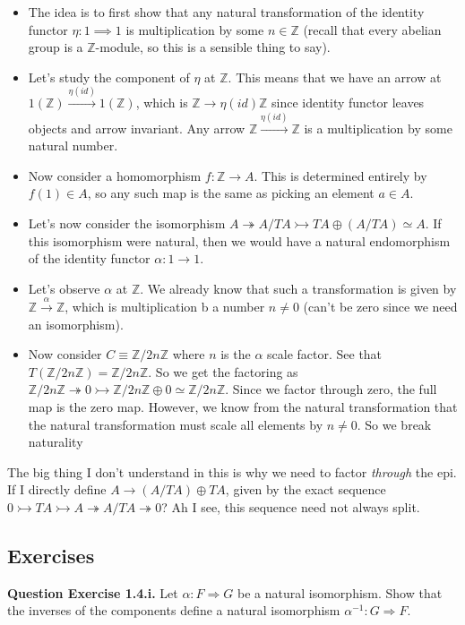 \documentclass[11pt]{report}
\newcommand{\Z}{\ensuremath{\mathbb{Z}}}
\newcommand{\inv}[1]{#1^{-1}}
\newcommand{\mono}{\rightarrowtail}
\newcommand{\epi}{\twoheadrightarrow}
\newcommand{\nt}{\Rightarrow}
\newcommand*{\question}[1]{\leavevmode\newline \textbf{Question #1.}}
\begin{document}
\begin{itemize}
\item The idea is to first show that any natural transformation of the identity functor $\eta: 1 \implies 1$ is multiplication by some $n \in \Z$
(recall that every abelian group is a \Z-module, so this is a sensible thing to say).
\item Let's study the component of $\eta$ at $\mathbb Z$.
This means that we have an arrow at $1(\Z) \xrightarrow{\eta(id)} 1(\Z)$, which is $\Z \rightarrow{\eta(id)} \Z$ since identity functor
leaves objects and arrow invariant. Any arrow $\Z \xrightarrow{\eta(id)} \Z$ is a multiplication by some natural number.
\item Now consider a homomorphism $f: \Z \rightarrow A$. This is determined entirely by $f(1) \in A$, so any such map is 
  the same as picking an element $a \in A$. 
\item Let's now consider the isomorphism $A \epi A/TA \mono TA \oplus (A/TA) \simeq A$. If this isomorphism were natural,
    then we would have a natural endomorphism of the identity functor $\alpha: 1 \rightarrow 1$.
\item Let's observe $\alpha$ at $\mathbb Z$. We already know that such a transformation is given by $\Z \xrightarrow{\alpha} \Z$,
    which is multiplication b a number $n \neq 0$ (can't be zero since we need an isomorphism).
\item Now consider $C \equiv \Z/2n\Z$ where $n$ is the $\alpha$ scale factor. See that $T(\Z/2n\Z) = \Z/2n\Z$.
    So we get the factoring as $\Z/2n\Z \epi 0 \mono \Z/2n\Z \oplus 0 \simeq \Z/2n\Z$. Since we factor through zero,
    the full map is the zero map. However, we know from the natural transformation that the natural transformation 
    must scale all elements by $n \neq 0$. So we break naturality
\end{itemize}

The big thing I don't understand in this is why we need to factor \emph{through} the epi. If I directly define
$A \rightarrow (A/TA) \oplus TA$, given by the exact sequence $0 \mono TA \mono A \epi A/TA \epi 0$? Ah I see, this sequence
need not always split. 


\subsection{Exercises}

\question{Exercise 1.4.i} Let $\alpha: F \nt G$ be a natural isomorphism. Show that the inverses of the components define a natural isomorphism $\inv\alpha: G \nt F$.
\end{document}
